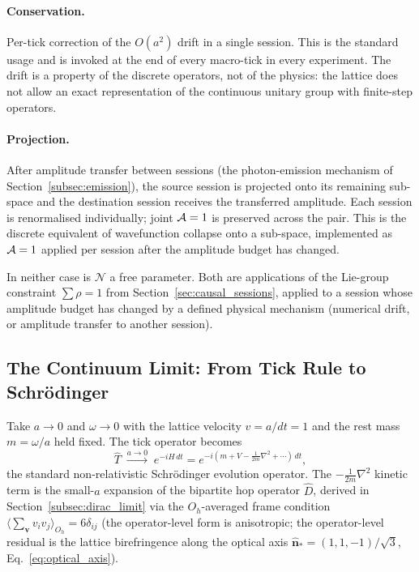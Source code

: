 \paragraph{Conservation.}
Per-tick correction of the $O(a^2)$ drift in a single session. This
is the standard usage and is invoked at the end of every macro-tick
in every experiment. The drift is a property of the discrete
operators, not of the physics: the lattice does not allow an exact
representation of the continuous unitary group with finite-step
operators.

\paragraph{Projection.}
After amplitude transfer between sessions (the photon-emission
mechanism of Section~\ref{subsec:emission}), the source session is
projected onto its remaining sub-space and the destination session
receives the transferred amplitude. Each session is renormalised
individually; joint $\mathcal{A}=1$ is preserved across the pair. This is
the discrete equivalent of wavefunction collapse onto a sub-space,
implemented as $\mathcal{A}=1$ applied per session after the amplitude
budget has changed.

In neither case is $\mathcal{N}$ a free parameter. Both are
applications of the Lie-group constraint
$\sum \rho = 1$ from Section~\ref{sec:causal_sessions}, applied to a
session whose amplitude budget has changed by a defined physical
mechanism (numerical drift, or amplitude transfer to another
session).

\subsection{The Continuum Limit: From Tick Rule to Schr\"odinger}
\label{subsec:continuum_to_schrodinger}

Take $a \to 0$ and $\omega \to 0$ with the lattice velocity
$v = a/dt = 1$ and the rest mass $m = \omega/a$ held fixed. The tick
operator becomes
\begin{equation}
    \hat{T} \;\xrightarrow{a \to 0}\;
        e^{-iH\,dt}
        = e^{-i(m + V - \tfrac{1}{2m}\nabla^2 + \cdots)\,dt},
    \label{eq:tick_continuum}
\end{equation}
the standard non-relativistic Schr\"odinger evolution operator. The
$-\tfrac{1}{2m}\nabla^2$ kinetic term is the small-$a$ expansion of
the bipartite hop operator $\hat{D}$, derived in
Section~\ref{subsec:dirac_limit} via the $O_h$-averaged frame
condition $\langle\sum_\mathbf{v} v_i v_j\rangle_{O_h} = 6\delta_{ij}$
(the operator-level form is anisotropic; the operator-level residual
is the lattice birefringence along the optical axis
$\hat{\mathbf{n}}_* = (1,1,-1)/\sqrt{3}$,
Eq.~\ref{eq:optical_axis}).


